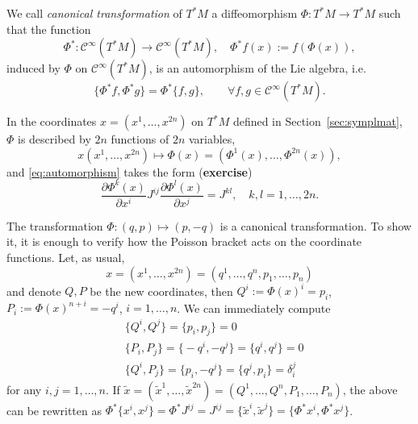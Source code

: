 \documentclass[english,fontsize=11pt,paper=a5,oneside]{scrbook}
\newcommand{\cC}{\mathcal{C}}
\theoremstyle{definition}
\newenvironment{example}
  {\pushQED{\qed}\renewcommand{\qedsymbol}{$\lozenge$}\examplex}
  {\popQED\endexamplex}
\begin{document}
\begin{tcolorbox}
  We call \emph{canonical transformation} of $T^*M$ a diffeomorphism $\Phi: T^*M\to T^*M$ such that the function
  \begin{equation}
    \Phi^*: \cC^\infty(T^*M) \to \cC^\infty(T^*M),\quad
    \Phi^* f(x) := f(\Phi(x)),
  \end{equation}
  induced by $\Phi$ on $\cC^\infty(T^*M)$, is an automorphism of the Lie algebra, i.e.
  \begin{equation}\label{eq:automorphism}
    \big\{\Phi^* f, \Phi^* g\big\} = \Phi^*\big\{f,g\big\}, \qquad\forall f,g\in\cC^\infty(T^*M).
  \end{equation}
\end{tcolorbox}

In the coordinates $x=(x^1, \ldots, x^{2n})$ on $T^*M$ defined in Section~\ref{sec:symplmat}, $\Phi$ is described by $2n$ functions of $2n$ variables,
\begin{equation}
  x(x^1,\ldots,x^{2n}) \mapsto \Phi(x) = \left(\Phi^1(x), \ldots, \Phi^{2n}(x)\right),
\end{equation}
and \eqref{eq:automorphism} takes the form (\textbf{exercise})
\begin{equation}\label{eq:cantrafocoord}
  \frac{\partial\Phi^k(x)}{\partial x^i} J^{ij} \frac{\partial\Phi^l(x)}{\partial x^j} = J^{kl},\quad k,l=1,\ldots,2n.
\end{equation}

\begin{example}
  The transformation $\Phi: (q,p) \mapsto (p, -q)$ is a canonical transformation.
  To show it, it is enough to verify how the Poisson bracket acts on the coordinate functions. Let, as usual, \begin{equation}
    x=(x^1, \ldots,x^{2n})=(q^1,\ldots,q^n,p_1,\ldots,p_n)
  \end{equation}
  and denote $Q,P$ be the new coordinates, then $Q^i := \Phi(x)^i = p_i$, $P_i := \Phi(x)^{n+i} = -q^i$, $i=1,\ldots, n$.
  We can immediately compute
  \begin{align}
     & \big\{Q^i, Q^j\big\} = \big\{p_i, p_j\big\} = 0                                  \\
     & \big\{P_i, P_j\big\} = \big\{-q^i, -q^j\big\} = \big\{q^i, q^j\big\} = 0         \\
     & \big\{Q^i, P_j\big\} = \big\{p_i, -q^j\big\} = \big\{q^j, p_i\big\} = \delta^j_i
  \end{align}
  for any $i,j=1,\ldots,n$.
  If $\widetilde x = (\widetilde x^1, \ldots, \widetilde x^{2n})= (Q^1, \ldots, Q^n, P_1,\ldots,P_n)$, the above can be rewritten as $\Phi^*\big\{x^i, x^j\big\} = \Phi^* J^{ij} = J^{ij} = \big\{\widetilde x^i, \widetilde x^j\big\} = \big\{\Phi^* x^i, \Phi^* x^j\big\}$.
\end{example}
\end{document}

